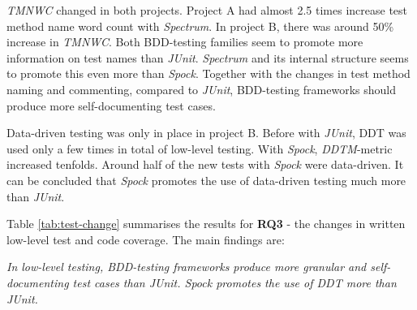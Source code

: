 \textit{TMNWC} changed in both projects. Project A had almost 2.5 times increase test method name word count with \textit{Spectrum}. In
project B, there was around 50\% increase in \textit{TMNWC}. Both BDD-testing families seem to promote more information on test
names than \textit{JUnit}. \textit{Spectrum} and its internal structure seems to promote this even more than \textit{Spock}. Together with the changes
in test method naming and commenting, compared to \textit{JUnit}, BDD-testing frameworks should produce more self-documenting test cases.

Data-driven testing was only in place in project B. Before with \textit{JUnit}, DDT was used only a few times in total
of low-level testing. With \textit{Spock}, \textit{DDTM}-metric increased tenfolds. Around half of the new tests with \textit{Spock} were data-driven.
It can be concluded that \textit{Spock} promotes the use of data-driven testing much more than \textit{JUnit}.

Table \ref{tab:test-change} summarises the results for \textbf{RQ3} - the changes in written low-level test and code coverage.
The main findings are:

\begin{center}
\begin{topbot}
\textit{In low-level testing, BDD-testing frameworks produce more granular and self-documenting test cases than JUnit.
Spock promotes the use of DDT more than JUnit.}
\end{topbot}
\end{center}
